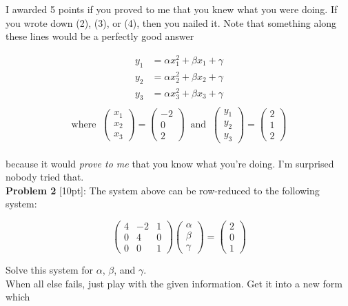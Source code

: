 \documentclass{article}
\def\a{\alpha}
\def\b{\beta}
\def\c{\gamma}
\begin{document}
I awarded 5 points if you proved to me that you knew what you were doing. If you wrote down (2), (3), or (4), then you nailed it. Note that something along these lines would be a perfectly good answer

\begin{align*}
y_1 &=  \a x_1^2 + \b x_1 + \c \\
y_2 &=  \a x_2^2 + \b x_2 + \c \\
y_3 &=  \a x_3^2 + \b x_3 + \c  \\
\end{align*}
\[
\text{where} \;\; \begin{pmatrix} x_1 \\ x_2 \\ x_3 \end{pmatrix} = \begin{pmatrix} -2 \\ 0 \\ 2 \end{pmatrix} \;\; \text{and} \;\; \begin{pmatrix} y_1 \\ y_2 \\ y_3 \end{pmatrix} = \begin{pmatrix} 2 \\ 1 \\ 2 \end{pmatrix}
\] \\

because it would \textit{prove to me} that you know what you're doing. I'm surprised nobody tried that. \\

\textbf{Problem 2} [10pt]: The system above can be row-reduced to the following system:

\[
\begin{pmatrix} 4 & -2 & 1 \\ 0 & 4 & 0 \\ 0 & 0 & 1 \end{pmatrix} \begin{pmatrix} \a \\ \b \\ \c \end{pmatrix} = \begin{pmatrix} 2 \\ 0 \\ 1 \end{pmatrix}
\]

Solve this system for $\a$, $\b$, and $\c$.\\

When all else fails, just play with the given information. Get it into a new form which
\end{document}
